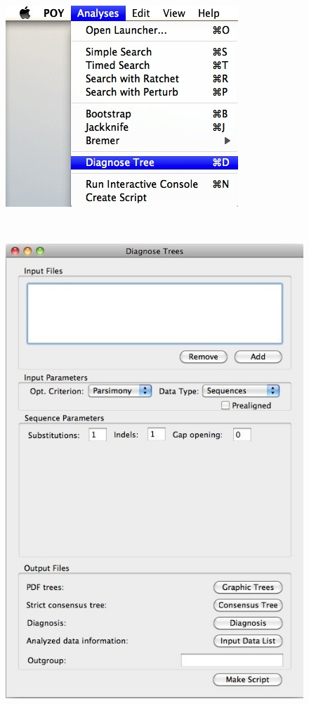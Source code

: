 {\begin{figure}[ht]
\centering
\begin{minipage}[c]{0.45\textwidth}
\includegraphics[width=\textwidth]{doc/figures/diagnose_menu.jpg}
\end{minipage}
\,
\begin{minipage}[c]{0.52\textwidth}
\includegraphics[width=\textwidth]{doc/figures/diagnose_window.jpg}

\end{minipage}
\end{figure}}
